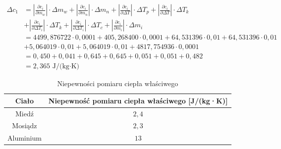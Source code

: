 \documentclass[a4paper,12pt]{article}
\begin{document}
\begin{align*}
    \Delta c_1 & = \left|\frac{\partial c_i}{\partial m_w}\right| \cdot \Delta m_w + \left|\frac{\partial c_i}{\partial m_n}\right| \cdot \Delta m_n + \left|\frac{\partial c_i}{\partial \Delta T}\right| \cdot \Delta T_p + \left|\frac{\partial c_i}{\partial \Delta T}\right| \cdot \Delta T_k \\
               & + \left|\frac{\partial c_i}{\partial \Delta T_i}\right| \cdot \Delta T_k + \left|\frac{\partial c_i}{\partial \Delta T_i}\right| \cdot \Delta T_c + \left|\frac{\partial c_i}{\partial m_i}\right| \cdot \Delta m_i                                                               \\
               & = 4499{,}876722 \cdot 0{,}0001 + 405{,}268400 \cdot 0{,}0001 + 64{,}531396 \cdot 0{,}01 + 64{,}531396 \cdot 0{,}01                                                                                                                                                                \\
               & + 5{,}064019 \cdot 0{,}01 + 5{,}064019 \cdot 0{,}01 + 4817{,}754936 \cdot 0{,}0001                                                                                                                                                                                                \\
               & = 0{,}450 + 0{,}041 + 0{,}645 + 0{,}645 + 0{,}051 + 0{,}051 + 0{,}482                                                                                                                                                                                                             \\
               & = 2{,}365\,\text{J/(kg$\cdot$K)}
\end{align*}



\begin{table}[H]
    \centering
    \begin{tabular}{|c|c|}
        \hline
        \textbf{Ciało} & \textbf{Niepewność pomiaru ciepła właściwego [J/(kg·K)]} \\
        \hline
        Miedź & $2{,}4$ \\
        \hline
        Mosiądz & $2{,}3$ \\
        \hline
        Aluminium & $13$ \\
        \hline
    \end{tabular}
    \caption{Niepewności pomiaru ciepła właściwego}
    \label{tab:niepewnosci_cieplo_wlasciwe}
\end{table}
\end{document}
